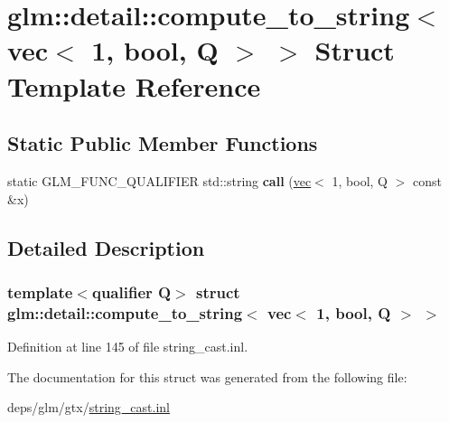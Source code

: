 \hypertarget{structglm_1_1detail_1_1compute__to__string_3_01vec_3_011_00_01bool_00_01Q_01_4_01_4}{}\section{glm\+:\+:detail\+:\+:compute\+\_\+to\+\_\+string$<$ vec$<$ 1, bool, Q $>$ $>$ Struct Template Reference}
\label{structglm_1_1detail_1_1compute__to__string_3_01vec_3_011_00_01bool_00_01Q_01_4_01_4}
\subsection*{Static Public Member Functions}
\begin{DoxyCompactItemize}
\item 
\mbox{\label{structglm_1_1detail_1_1compute__to__string_3_01vec_3_011_00_01bool_00_01Q_01_4_01_4_ad6119763fcff0254a57ae8a51a9f5915}} 
static G\+L\+M\+\_\+\+F\+U\+N\+C\+\_\+\+Q\+U\+A\+L\+I\+F\+I\+ER std\+::string {\bfseries call} (\hyperlink{structglm_1_1vec}{vec}$<$ 1, bool, Q $>$ const \&x)
\end{DoxyCompactItemize}


\subsection{Detailed Description}
\subsubsection*{template$<$qualifier Q$>$\newline
struct glm\+::detail\+::compute\+\_\+to\+\_\+string$<$ vec$<$ 1, bool, Q $>$ $>$}



Definition at line 145 of file string\+\_\+cast.\+inl.



The documentation for this struct was generated from the following file\+:\begin{DoxyCompactItemize}
\item 
deps/glm/gtx/\hyperlink{string__cast_8inl}{string\+\_\+cast.\+inl}\end{DoxyCompactItemize}
